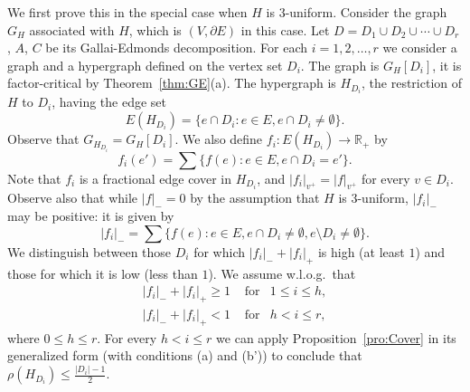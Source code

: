 \documentclass{article}
\theoremstyle{definition}
\begin{document}
We first prove this in the special case when $H$ is $3$-uniform. Consider the graph $G_H$ associated with $H$, which is $(V, \partial E)$ in this case. Let $D = D_1 \cup D_2 \cup \cdots \cup D_r$, $A$, $C$ be its Gallai-Edmonds decomposition. For each $i=1,2, \ldots , r$ we consider a graph and a hypergraph defined on the vertex set $D_i$. The graph is $G_H[D_i]$, it is factor-critical by Theorem~\ref{thm:GE}(a). The hypergraph is $H_{D_i}$, the restriction of $H$ to $D_i$, having the edge set
\begin{equation} \label{eq:rest}
E(H_{D_i}) = \{ e \cap D_i: e \in E, e\cap D_i \ne \emptyset\}.
\end{equation}
Observe that $G_{H_{D_i}} = G_H[D_i]$. We also define $f_i: E(H_{D_i}) \to \mathbb{R}_+$ by
\begin{equation} \label{eq:frest}
f_i(e') = \sum \{f(e): e \in E, e \cap D_i = e'\}.
\end{equation}
Note that $f_i$ is a fractional edge cover in $H_{D_i}$, and $|f_i|_{v^+} = |f|_{v^+}$ for every $v \in D_i$. Observe also that while $|f|_- = 0$ by the assumption that $H$ is $3$-uniform, $|f_i|_-$ may be positive: it is given by
\begin{equation} \label{eq:minus}
|f_i|_- = \sum \{ f(e): e \in E, e \cap D_i \ne \emptyset ,e \setminus D_i \ne \emptyset \}.
\end{equation}
We distinguish between those $D_i$ for which $|f_i|_- + |f_i|_+$ is high (at least $1$) and those for which it is low (less than $1$). We assume w.l.o.g.\ that
\begin{eqnarray*}
|f_i|_- + |f_i|_+ \ge 1\,\, & \textrm{for} & 1 \le i \le h, \\
|f_i|_- + |f_i|_+ < 1\,\, & \textrm{for} & h < i \le r,
\end{eqnarray*}
where $0 \le h \le r$. For every $h < i \le r$ we can apply Proposition~\ref{pro:Cover} in its generalized form (with conditions (a) and (b')) to conclude that $\rho(H_{D_i}) \le \frac{|D_i|-1}{2}$.
\end{document}
